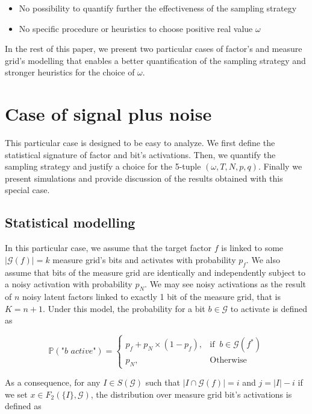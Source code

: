 \documentclass[a4paper, 11pt]{article}
\begin{document}
\begin{itemize}
\item No possibility to quantify further the effectiveness of the sampling strategy 
\item No specific procedure or heuristics to choose positive real value $\omega$
\end{itemize}

In the rest of this paper, we present two particular cases of factor's and measure grid's modelling that enables a better quantification of the sampling strategy and stronger heuristics for the choice of $\omega$. 

\section{Case of signal plus noise}

This particular case is designed to be easy to analyze. We first define the statistical signature of factor and bit's activations. Then, we quantify the sampling strategy and justify a choice for the 5-tuple $(\omega, T, N, p, q)$. Finally we present simulations and provide discussion of the results obtained with this special case.

\subsection{Statistical modelling}

In this particular case, we assume that the target factor $f$ is linked to some $\vert \mathcal{G}(f)\vert = k$ measure grid's bits and activates with probability $p_f$. We also assume that bits of the measure grid are identically and independently subject to a noisy activation with probability $p_N$. We may see noisy activations as the result of $n$ noisy latent factors linked to exactly 1 bit of the measure grid, that is $K=n + 1$. Under this model, the probability for a bit $b\in \mathcal{G}$ to activate is defined as 

\begin{equation*}
\mathbb{P} \left( \textit{"b active"} \right) = \begin{cases} p_{f} + p_N \times (1-p_{f}), & \text{if }\ b \in \mathcal{G}(f^{*}) \\ p_N, & \text{Otherwise} \end{cases}
\end{equation*}

As a consequence, for any $I \in S(\mathcal{G})$ such that $\vert I \cap \mathcal{G}(f) \vert = i$ and $j = \vert I \vert -i$ if we set $x \in F_2 (\{I\} , \mathcal{G})$, the distribution over measure grid bit's activations is defined as
\end{document}
